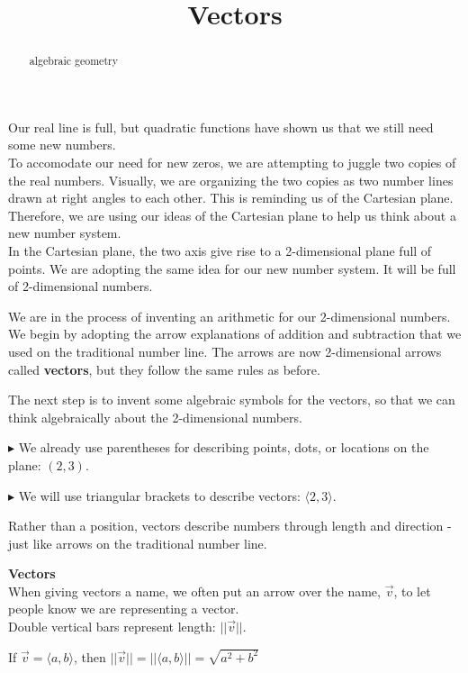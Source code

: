 \documentclass{ximera}
\title{Vectors}
\begin{document}
\begin{abstract}
algebraic geometry
\end{abstract}
\maketitle






Our real line is full, but quadratic functions have shown us that we still need some new numbers.  \\

To accomodate our need for new zeros, we are attempting to juggle two copies of the real numbers. Visually, we are organizing the two copies as two number lines drawn at right angles to each other.  This is reminding us of the Cartesian plane.  Therefore, we are using our ideas of the Cartesian plane to help us think about a new number system.  \\



In the Cartesian plane, the two axis give rise to a 2-dimensional plane full of points.  We are adopting the same idea for our new number system.  It will be full of 2-dimensional numbers.


We are in the process of inventing an arithmetic for our 2-dimensional numbers.  We begin by adopting the arrow explanations of addition and subtraction that we used on the traditional number line. The arrows are now 2-dimensional arrows called \textbf{vectors}, but they follow the same rules as before.

The next step is to invent some algebraic symbols for the vectors, so that we can think algebraically about the 2-dimensional numbers.


$\blacktriangleright$ We already use parentheses for describing points, dots, or locations on the plane: $(2, 3)$.


$\blacktriangleright$ We will use triangular brackets to describe vectors: $\langle 2, 3 \rangle$.  

Rather than a position, vectors describe numbers through length and direction - just like arrows on the traditional number line. 



\begin{notation}  \textbf{\textcolor{blue!55!black}{Vectors}} \\


When giving vectors a name, we often put an arrow over the name, $\vec{v}$, to let people know we are representing a vector. \\

Double vertical bars represent length: $|| \vec{v} ||$.

If $\vec{v} = \langle a, b \rangle$, then $|| \vec{v} || = || \langle a, b \rangle || = \sqrt{a^2 + b^2}$

\end{notation}
\end{document}
